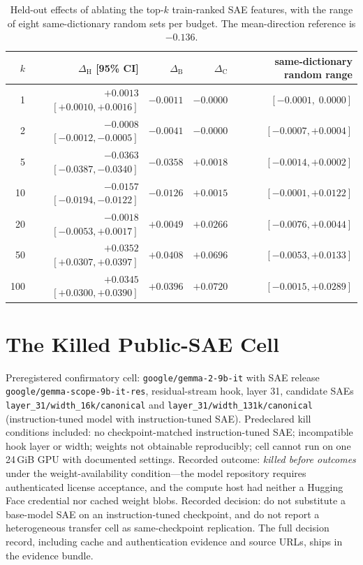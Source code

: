 \documentclass[11pt]{article}
\newcommand{\dH}{\ensuremath{\Delta_{\mathrm{H}}}}
\newcommand{\dB}{\ensuremath{\Delta_{\mathrm{B}}}}
\newcommand{\dC}{\ensuremath{\Delta_{\mathrm{C}}}}
\begin{document}
\begin{table}[t]
\centering
\small
\begin{tabular}{@{}rrrrr@{}}
\toprule
$k$ & \dH{} [95\% CI] & \dB{} & \dC{} & same-dictionary random range \\
\midrule
1   & $+0.0013$ $[+0.0010,+0.0016]$ & $-0.0011$ & $-0.0000$ & $[-0.0001,\;0.0000]$ \\
2   & $-0.0008$ $[-0.0012,-0.0005]$ & $-0.0041$ & $-0.0000$ & $[-0.0007,+0.0004]$ \\
5   & $-0.0363$ $[-0.0387,-0.0340]$ & $-0.0358$ & $+0.0018$ & $[-0.0014,+0.0002]$ \\
10  & $-0.0157$ $[-0.0194,-0.0122]$ & $-0.0126$ & $+0.0015$ & $[-0.0001,+0.0122]$ \\
20  & $-0.0018$ $[-0.0053,+0.0017]$ & $+0.0049$ & $+0.0266$ & $[-0.0076,+0.0044]$ \\
50  & $+0.0352$ $[+0.0307,+0.0397]$ & $+0.0408$ & $+0.0696$ & $[-0.0053,+0.0133]$ \\
100 & $+0.0345$ $[+0.0300,+0.0390]$ & $+0.0396$ & $+0.0720$ & $[-0.0015,+0.0289]$ \\
\bottomrule
\end{tabular}
\caption{Held-out effects of ablating the top-$k$ train-ranked SAE features,
with the range of eight same-dictionary random sets per budget.  The
mean-direction reference is $-0.136$.}
\label{tab:budgetfull}
\end{table}

\section{The Killed Public-SAE Cell}
\label{app:killed}

Preregistered confirmatory cell: \texttt{google/gemma-2-9b-it} with SAE
release \texttt{google/gemma-scope-9b-it-res}, residual-stream hook, layer
31, candidate SAEs \texttt{layer\_31/width\_16k/canonical} and
\texttt{layer\_31/width\_131k/canonical} (instruction-tuned model with
instruction-tuned SAE).  Predeclared kill conditions included: no
checkpoint-matched instruction-tuned SAE; incompatible hook layer or width;
weights not obtainable reproducibly; cell cannot run on one 24\,GiB GPU with
documented settings.  Recorded outcome: \emph{killed before outcomes} under
the weight-availability condition---the model repository requires
authenticated license acceptance, and the compute host had neither a
Hugging Face credential nor cached weight blobs.  Recorded decision: do not
substitute a base-model SAE on an instruction-tuned checkpoint, and do not
report a heterogeneous transfer cell as same-checkpoint replication.  The
full decision record, including cache and authentication evidence and source
URLs, ships in the evidence bundle.
\end{document}
